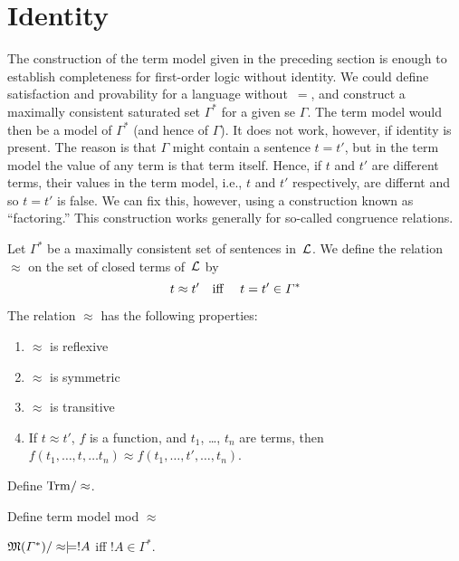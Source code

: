 \documentclass[open-logic-section]{subfiles}
\begin{document}
\section{Identity}

\begin{wordy}
The construction of the term model given in the preceding section is
enough to establish completeness for first-order logic without
identity.  We could define satisfaction and provability for a language
without~$=$, and construct a maximally consistent saturated set
$\Gamma^*$ for a given se $\Gamma$.  The term model would then be a
model of $\Gamma^*$ (and hence of $\Gamma$).  It does not work,
however, if identity is present.  The reason is that $\Gamma$ might
contain a sentence $t = t'$, but in the term model the value of any
term is that term itself. Hence, if $t$ and $t'$ are different terms,
their values in the term model, i.e., $t$ and $t'$ respectively, are
differnt and so $t = t'$ is false.  We can fix this, however, using a
construction known as ``factoring.''  This construction works
generally for so-called congruence relations.
\end{wordy}

\begin{defn}
Let $\Gamma^*$ be a maximally consistent set of sentences in~$\mathcal
L$. We define the relation $\approx$ on the set of closed terms
of~$\mathcal L$ by
\[
t \approx t' \text{\quad iff \quad} t = t' \in \Gamma^*
\]
\end{defn}

\begin{prop}
The relation $\approx$ has the following properties:
\begin{enumerate}
\item $\approx$ is reflexive
\item $\approx$ is symmetric
\item  $\approx$ is transitive
\item If $t \approx t'$, $f$ is a function, and $t_1$, \dots, $t_n$ are
  terms, then $f(t_1,\dots, t, \dots t_n) \approx f(t_1, \dots, t',
  \dots, t_n)$.
\end{enumerate}
\end{prop}


\begin{defn}
Define $\Trm/\approx$.
\end{defn}

\begin{defn}
Define term model mod $\approx$
\end{defn}

\begin{prop}
$\Sat{M(\Gamma^*)/\approx}{!A}$ iff $!A \in \Gamma^*$.
\end{prop}
\end{document}
